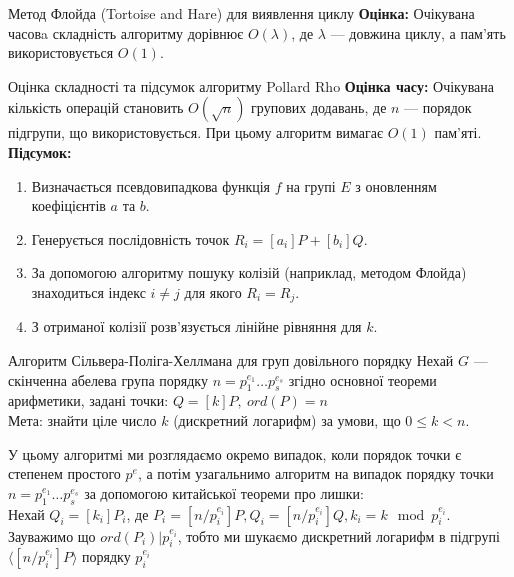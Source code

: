 \documentclass[9pt]{beamer}
\begin{document}
\begin{darkframes}
\begin{frame}{Метод Флойда (Tortoise and Hare) для виявлення циклу}
  \textbf{Оцінка:}  
  Очікувана часовa складність алгоритму дорівнює \(O(\lambda)\), де \(\lambda\) --- довжина циклу, а пам'ять використовується \(O(1)\).
  
\end{frame}


\begin{frame}{Оцінка складності та підсумок алгоритму Pollard Rho}
  \textbf{Оцінка часу:}  
  Очікувана кількість операцій становить \(O(\sqrt{n})\) групових додавань, де \(n\) — порядок підгрупи, що використовується. При цьому алгоритм вимагає \(O(1)\) пам'яті.\\[2mm]
  \textbf{Підсумок:}
  \begin{enumerate}
    \item Визначається псевдовипадкова функція \(f\) на групі \(E\) з оновленням коефіцієнтів \(a\) та \(b\).
    \item Генерується послідовність точок \(R_i = [a_i]P + [b_i]Q\).
    \item За допомогою алгоритму пошуку колізій (наприклад, методом Флойда) знаходиться індекс \(i \neq j\) для якого \(R_i = R_j\).
    \item З отриманої колізії розв’язується лінійне рівняння для \(k\).
  \end{enumerate}
\end{frame}

\begin{frame}{Алгоритм Сільвера-Поліга-Хеллмана для груп довільного порядку}
  Нехай \(G\) — скінченна абелева група порядку \(n = p_1^{e_1} \dots p_s^{e_s} \) згідно основної теореми арифметики, задані точки: $Q=[k]P,\ ord(P)=n$ \\
  Мета: знайти ціле число \(k\) (дискретний логарифм) за умови, що \(0 \le k < n\).
  
  У цьому алгоритмі ми розглядаємо окремо випадок, коли порядок точки є степенем простого \(p^e\), а потім узагальнимо алгоритм на випадок порядку точки \(n = p_1^{e_1} \dots p_s^{e_s} \) за допомогою китайської теореми про лишки: \\
  Нехай $Q_i=[k_i]P_i$, де $P_i=[n/p_i^{e_i}]P, Q_i=[n/p_i^{e_i}]Q, k_i=k \mod p_i^{e_i}$. Зауважимо що $ord(P_i) | p_i^{e_i}$, тобто ми шукаємо дискретний логарифм в підгрупі $\langle [n/p_i^{e_i}]P \rangle$ порядку $p_i^{e_i}$
\end{frame}


\end{darkframes}
\end{document}
